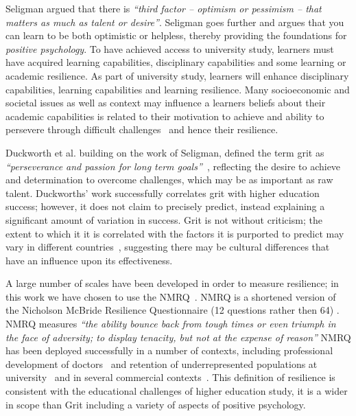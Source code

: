 \documentclass[sigconf]{acmart}
\begin{document}
Seligman argued that there is {\em``third factor -- optimism or pessimism -- that matters as much as talent or desire''}\cite[p.~13]{Seligman90}. Seligman goes further and argues that you can learn to be both optimistic or helpless, thereby providing the foundations for {\em positive psychology}. To have achieved access to university study, learners must have acquired learning capabilities, disciplinary capabilities and some learning or academic resilience. As part of university study, learners will enhance disciplinary capabilities, learning capabilities and learning resilience.  Many socioeconomic and societal issues as well as context may influence a learners beliefs about their academic capabilities is related to their motivation to achieve and ability to persevere through difficult challenges~\cite{ZIMMERMAN200082,Bandura1977} and hence their resilience. 
 
Duckworth et al. building on the work of Seligman, defined the term grit as {\em``perseverance and passion for long term goals''~\cite[p.~1087]{Duckworth2007}}, reflecting the desire to achieve and determination to overcome challenges, which may be as important as raw talent. Duckworths' work successfully correlates grit with higher education success; however, it does not claim to precisely predict, instead explaining a significant amount of variation in success. Grit is not without criticism; the extent to which it it is correlated with the factors it is purported to predict may vary in different countries~\cite{Datu2016, Tyumeneva2017}, suggesting there may be cultural differences that have an influence upon its effectiveness. 

A large number of scales have been developed in order to measure resilience; in this work we have chosen to use the NMRQ~\cite{Clarke2010}. NMRQ is a shortened version of the Nicholson McBride Resilience Questionnaire (12 questions rather then 64) \cite{Clarke2010}. NMRQ measures {\em``the ability bounce back from tough times or even triumph in the face of adversity; to display tenacity, but not at the expense of reason''\cite[p.~1]{Clarke2010}} NMRQ has been deployed successfully in a number of contexts, including professional development of doctors~\cite{Tregoningg251} and retention of underrepresented populations at university~\cite{Daniels2015} and in several commercial contexts~\cite{Clarke2010}. This definition of resilience is consistent with the educational challenges of higher education study, it is a wider in scope than Grit including a variety of aspects of positive psychology.
\end{document}
